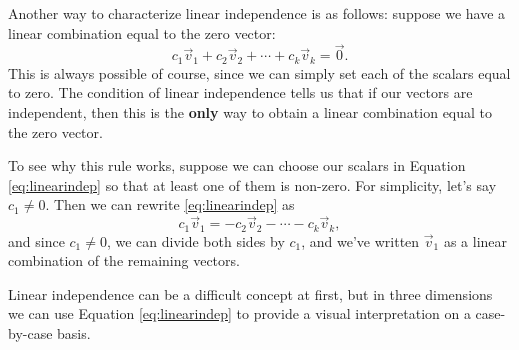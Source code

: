 \smallskip


\smallskip

Another way to characterize linear independence is as follows: suppose we have a linear combination equal to the zero vector:
\begin{equation}\label{eq:linearindep}
c_1\vec{v}_1+c_2\vec{v}_2+\cdots +c_k\vec{v}_k = \vec{0}.
\end{equation}
This is always possible of course, since we can simply set each of the scalars equal to zero. The condition of linear independence tells us that if our vectors are independent, then this is the \textbf{only} way to obtain a linear combination equal to the zero vector. 

To see why this rule works, suppose we can choose our scalars in Equation \eqref{eq:linearindep} so that at least one of them is non-zero. For simplicity, let's say $c_1\neq 0$. Then we can rewrite \eqref{eq:linearindep} as
\[
c_1\vec{v}_1 = -c_2\vec{v}_2-\cdots - c_k\vec{v}_k,
\]
and since $c_1\neq 0$, we can divide both sides by $c_1$, and we've written $\vec{v}_1$ as a linear combination of the remaining vectors.


Linear independence can be a difficult concept at first, but in three dimensions we can use Equation \eqref{eq:linearindep} to provide a visual interpretation on a case-by-case basis. 

\smallskip

